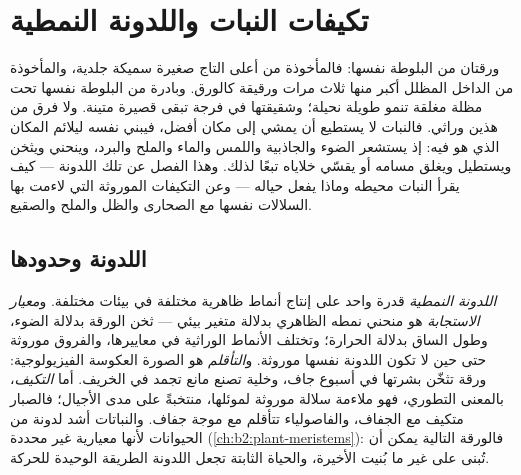 \chapter{تكيفات النبات واللدونة النمطية}\label{ch:b2:plant-plasticity}

ورقتان من البلوطة نفسها: فالمأخوذة من أعلى التاج
صغيرة سميكة جلدية، والمأخوذة من الداخل المظلل أكبر منها
ثلاث مرات ورقيقة كالورق. وبادرة من البلوطة نفسها تحت
مظلة مغلقة تنمو طويلة نحيلة؛ وشقيقتها في فرجة تبقى
قصيرة متينة. ولا فرق من هذين وراثي. فالنبات لا يستطيع أن يمشي
إلى مكان أفضل، فيبني نفسه ليلائم المكان الذي هو فيه: إذ
يستشعر الضوء والجاذبية واللمس والماء والملح والبرد، وينحني
ويثخن ويستطيل ويغلق مسامه أو يقسّي خلاياه
تبعًا لذلك. وهذا الفصل عن تلك اللدونة --- كيف يقرأ النبات
محيطه وماذا يفعل حياله --- وعن
التكيفات الموروثة التي لاءمت بها السلالات نفسها
مع الصحارى والظل والملح والصقيع.

\section{اللدونة وحدودها}

\begin{definition}\label{def:b2:plant-plasticity:plasticity}
\emph{اللدونة النمطية} قدرة  واحد على
إنتاج أنماط ظاهرية مختلفة في بيئات مختلفة. و\emph{معيار
الاستجابة}  هو منحني نمطه الظاهري
بدلالة متغير بيئي --- ثخن الورقة بدلالة الضوء،
وطول الساق بدلالة الحرارة؛ وتختلف الأنماط الوراثية في معاييرها،
والفروق موروثة حتى حين لا تكون اللدونة نفسها
موروثة. و\emph{التأقلم} هو الصورة العكوسة الفيزيولوجية:
ورقة تثخّن بشرتها في أسبوع جاف، وخلية تصنع
مانع تجمد في الخريف. أما \emph{التكيف}، بالمعنى التطوري،
فهو ملاءمة سلالة موروثة لموئلها، منتخبةً على مدى
الأجيال؛ فالصبار متكيف مع الجفاف، والفاصولياء تتأقلم مع
موجة جفاف. والنباتات أشد لدونة من الحيوانات لأنها
معيارية غير محددة (\cref{ch:b2:plant-meristems}): فالورقة
التالية يمكن أن تُبنى على غير ما بُنيت الأخيرة، والحياة الثابتة
تجعل اللدونة الطريقة الوحيدة للحركة.
\end{definition}

